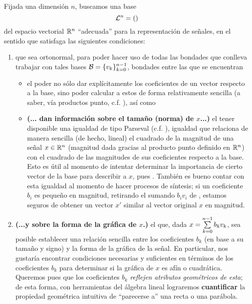 \noindent 
\begin{listaObj}
\label{lista de objetivos}
Fijada una dimensión $n$, 
buscamos una base 
\begin{equation}
\label{eq1: 28Nov}
\mathcal{L}^{n}=()
\end{equation}
del espacio vectorial
$\mathbb{R}^{n}$ ``adecuada'' para la representación de señales,
en el sentido que satisfaga
las siguientes condiciones: 

\begin{enumerate}
\item 
que
sea ortonormal, para poder hacer uso de todas
las bondades que conlleva 
trabajar con tales bases $\mathcal{B}=\{ v_{k} \}_{k=0}^{n-1}$, 
bondades entre las que se encuentran
\begin{itemize}
\item 
\textbf{}
el poder no sólo dar explícitamente los coeficientes
de un vector respecto a la base, sino poder calcular a estos
de forma relativamente sencilla (a saber, vía productos punto,
c.f. ), así como
\item
\textbf{\textcolor{ameMorado}{(... dan información sobre el tamaño (norma) de $x$...)}}
el tener disponible una igualdad de tipo Parseval
(c.f. ), igualdad que
relaciona de manera sencilla (de hecho, lineal)
el cuadrado de
la magnitud de una señal $x \in \mathbb{R}^{n}$ (magnitud dada
gracias al producto punto definido en $\mathbb{R}^{n}$)
con el cuadrado de las magnitudes de sus coeficientes
respecto a la base. Esto es útil al momento
de intentar determinar la importancia 
de cierto vector de la base para describir a $x$, pues 
. También es bueno contar con esta igualdad
al momento de hacer procesos de síntesis; si un coeficiente
$b_{i}$ es pequeño en magnitud, retirando el sumando
$b_{i}v_{i}$ de \TODO{--}, estamos seguros de obtener
un vector $x'$ similar al vector original $x$
en magnitud.
\end{itemize}
\item \textbf{
\textcolor{ameMorado}{(...y sobre la forma de la
gráfica de $x$.)}} el que,
dada $x = \sum\limits_{k=0}^{n-1}b_{k}v_{k}$,
sea posible establecer
una relación sencilla entre los coeficientes $b_{k}$
(en base a su tamaño y signo) y la forma de la gráfica de la señal.
En particular, nos gustaría encontrar condiciones
necesarias y suficientes 
en términos de los coeficientes $b_{k}$ para determinar
si la gráfica de $x$ es afín o cuadrática.
Queremos pues que los coeficientes $b_{k}$
\textit{reflejen atributos geométricos de esta};
de esta forma, 
con herramientas del álgebra lineal lograremos \textbf{cuantificar}
la propiedad geométrica intuitiva de ``parecerse a''
una recta o una parábola.
\end{enumerate} 

\end{listaObj}


